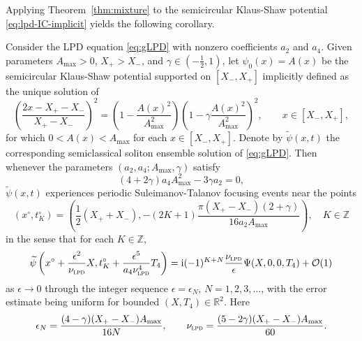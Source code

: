 \documentclass[12pt]{amsart}
\numberwithin{equation}{section}
\newcommand{\ii}{\mathrm{i}}
\newcommand{\Z}{\mathbb{Z}}
\newcommand{\eps}{\epsilon}
\newcommand{\bigo}[1]{ \mathcal{O}\! \left( #1 \right) }
\begin{document}
Applying Theorem~\ref{thm:mixture} to the semicircular Klaus-Shaw potential \eqref{eq:lpd-IC-implicit} yields the following corollary.
\begin{cor}
\label{cor:glpd}
Consider the LPD equation \eqref{eq:gLPD} with nonzero coefficients $a_2$ and $a_4$. Given parameters $A_\mathrm{max} >0$, $X_+ > X_-$, and $\gamma \in (-\tfrac{1}{2},1)$, let $\psi_0(x)= A(x)$ be the semicircular Klaus-Shaw potential supported on $[X_-, X_+]$ implicitly defined as the unique solution of 
\begin{equation}
	\left( \frac{2x - X_+  - X_-}{X_+ - X_-} \right)^2 = 
	\left( 1 - \frac{ A(x)^2}{A^2_\mathrm{max}} \right)\left( 1 - \gamma\frac{ A(x)^2}{A^2_\mathrm{max}} \right)^2, \qquad
	x \in [X_-, X_+], 
\label{eq:gLPD.IC2}
\end{equation}
for which $0 <  A(x) <  A_\mathrm{max}$ for each $x \in [X_-, X_+]$.
Denote by $\widetilde \psi(x,t)$ the corresponding semiclassical soliton ensemble solution of \eqref{eq:gLPD}. Then whenever the parameters $(a_2, a_4; A_\mathrm{max}, \gamma)$ satisfy
\begin{equation}\label{eq:gLPD.focus.condition}
	(4+2\gamma) a_4 A_\mathrm{max}^2 -   3 \gamma a_2 = 0,  
\end{equation}
$\widetilde \psi(x,t)$ experiences periodic Suleimanov-Talanov focusing events near the points 
\begin{equation}
(x^\circ, t^\circ_K)=\left(\frac{1}{2}(X_+ + X_-),  -(2K+1) \frac{\pi(X_+ - X_-)(2+\gamma)}{16 a_2 A_\mathrm{max}}\right), 
\quad K \in \Z
\end{equation}
in the sense that for each $K\in\mathbb{Z}$,
\begin{equation}
\widetilde{\psi}\left(x^\circ + \frac{\eps^2}{\nu_\textsc{lpd} }X,  t^\circ_K + \frac{\eps^{5}}{a_4 \nu_\textsc{lpd}^4 } T_4 \right) 
=\ii (-1)^{K+N} \frac{\nu_\textsc{lpd}}{\eps}\Psi(X,0,0,T_4) + \bigo{1}
\label{eq:cor.glpd.coords}
\end{equation}
as $\eps\to 0$ through the integer sequence $\eps=\eps_N$, $N=1,2,3,\dots$, with the error estimate being uniform for bounded $(X,T_4)\in\mathbb{R}^2$. Here
\begin{equation}
	\eps_N = \frac{(4-\gamma)(X_+ - X_-) A_\mathrm{max}}{16N}, 
	\qquad
	\nu_\textsc{lpd} = \frac{(5-2\gamma)(X_+ - X_-)A_\mathrm{max}} {60}.
\label{eq:LPD_epsilon}	
\end{equation}
\end{cor}
\end{document}
